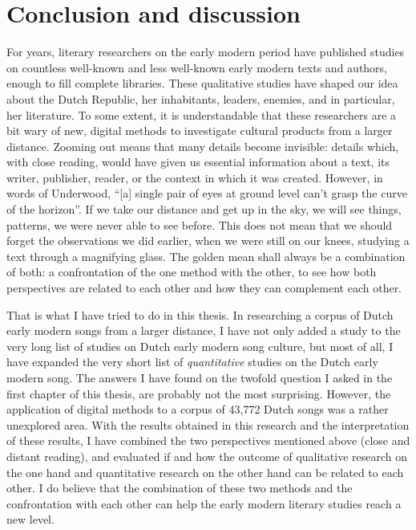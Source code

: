 \chapter{Conclusion and discussion}

For years, literary researchers on the early modern period have published studies on countless well-known and less well-known early modern texts and authors, enough to fill complete libraries. These qualitative studies have shaped our idea about the Dutch Republic, her inhabitants, leaders, enemies, and in particular, her literature. To some extent, it is understandable that these researchers are a bit wary of new, digital methods to investigate cultural products from a larger distance. Zooming out means that many details become invisible: details which, with close reading, would have given us essential information about a text, its writer, publisher, reader, or the context in which it was created. However, in words of Underwood, \enquote{[a] single pair of eyes at ground level can't grasp the curve of the horizon}.\autocite[x]{underwood_distant_2019} If we take our distance and get up in the sky, we will see things, patterns, we were never able to see before. This does not mean that we should forget the observations we did earlier, when we were still on our knees, studying a text through a magnifying glass. The golden mean shall always be a combination of both: a confrontation of the one method with the other, to see how both perspectives are related to each other and how they can complement each other.

That is what I have tried to do in this thesis. In researching a corpus of Dutch early modern songs from a larger distance, I have not only added a study to the very long list of studies on Dutch early modern song culture, but most of all, I have expanded the very short list of \textit{quantitative} studies on the Dutch early modern song. The answers I have found on the twofold question I asked in the first chapter of this thesis, are probably not the most surprising. However, the application of digital methods to a corpus of 43,772 Dutch songs was a rather unexplored area. With the results obtained in this research and the interpretation of these results, I have combined the two perspectives mentioned above (close and distant reading), and evaluated if and how the outcome of qualitative research on the one hand and quantitative research on the other hand can be related to each other. I do believe that the combination of these two methods and the confrontation with each other can help the early modern literary studies reach a new level.

